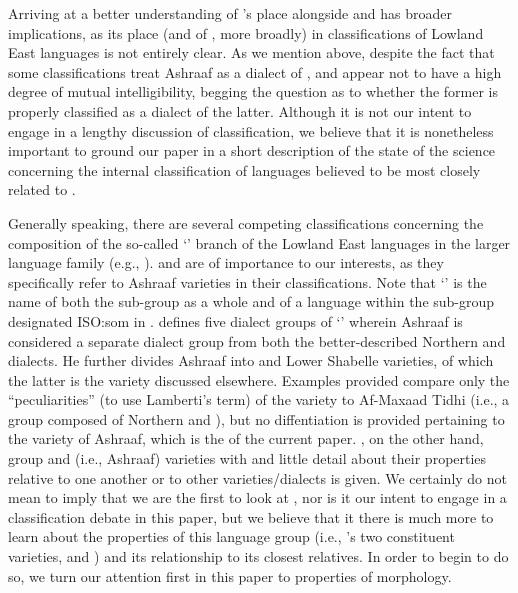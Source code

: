 \documentclass[output=paper,modfonts,nonflat,
hidelinks
]{langsci/langscibook}
\begin{document}
 Arriving at a better understanding of 's place alongside  and  has broader implications, as its place (and of , more broadly) in classifications of Lowland East  languages is not entirely clear. As we mention above, despite the fact that some classifications treat Ashraaf as a dialect of ,  and  appear not to have a high degree of mutual intelligibility, begging the question as to whether the former is properly classified as a dialect of the latter. Although it is not our intent to engage in a lengthy discussion of classification, we believe that it is nonetheless important to ground our paper in a short description of the state of the science concerning the internal classification of languages believed to be most closely related to . 
 
 Generally speaking, there are several competing classifications concerning the composition of the so-called `' branch of the Lowland East  languages in the larger  language family (e.g., \citealt{Abdhullahi2000,EhretAli1984,Heine1978,Lamberti1984,Moreno1955}). \citet{Lamberti1984} and \citet{EhretAli1984} are of importance to our interests, as they specifically refer to Ashraaf varieties in their classifications. Note that `' is the name of both the sub-group as a whole and of a language within the sub-group designated ISO:som in \citet{Ethnologue19}. \citet{Lamberti1984} defines five dialect groups of `' wherein Ashraaf is considered a separate dialect group from both the better-described Northern and   dialects. He further divides Ashraaf into  and Lower Shabelle varieties, of which the latter is the  variety discussed elsewhere. Examples provided compare only the ``peculiarities'' (to use Lamberti's term) of the  variety to Af-Maxaad Tidhi (i.e., a group composed of Northern and  ), but no diffentiation is provided pertaining to the  variety of Ashraaf, which is the  of the current paper. \citet{EhretAli1984}, on the other hand, group  and  (i.e., Ashraaf) varieties with   and little detail about their properties relative to one another or to other varieties/dialects is given. We certainly do not mean to imply that we are the first to look at , nor is it our intent to engage in a classification debate in this paper, but we believe that it there is much more to learn about the properties of this language group (i.e., 's two constituent varieties,  and ) and its relationship to its closest relatives. In order to begin to do so, we turn our attention first in this paper to properties of  morphology.
 
\end{document}
